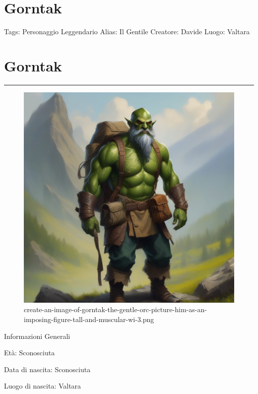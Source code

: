 \section{Gorntak}\label{gorntak}

Tags: Personaggio Leggendario Alias: Il Gentile Creatore: Davide Luogo:
Valtara

\section{Gorntak}\label{gorntak-1}

\begin{center}\rule{0.5\linewidth}{0.5pt}\end{center}

\begin{figure}
\centering
\includegraphics{create-an-image-of-gorntak-the-gentle-orc-picture-him-as-an-imposing-figure-tall-and-muscular-wi-3.png}
\caption{create-an-image-of-gorntak-the-gentle-orc-picture-him-as-an-imposing-figure-tall-and-muscular-wi-3.png}
\end{figure}

Informazioni Generali

Età: Sconosciuta

Data di nascita: Sconosciuta

Luogo di nascita: Valtara

